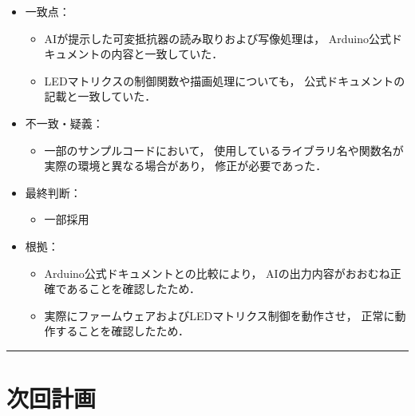 \documentclass[uplatex,dvipdfmx,a4paper,11pt]{jsarticle}
\newcommand{\sectionrule}{\par\medskip\noindent\rule{\linewidth}{0.6pt}\par\medskip}
\begin{document}
\begin{itemize}

    \item 一致点：
      \begin{itemize}
        \item AIが提示した可変抵抗器の読み取りおよび写像処理は，
        Arduino公式ドキュメントの内容と一致していた．

        \item LEDマトリクスの制御関数や描画処理についても，
        公式ドキュメントの記載と一致していた．
      \end{itemize}

      \item 不一致・疑義：
    \begin{itemize}
      \item 一部のサンプルコードにおいて，
      使用しているライブラリ名や関数名が実際の環境と異なる場合があり，
      修正が必要であった．
    \end{itemize}

  \item 最終判断：
    \begin{itemize}
      \item 一部採用
    \end{itemize}

    \item 根拠：
    \begin{itemize}
      \item Arduino公式ドキュメントとの比較により，
      AIの出力内容がおおむね正確であることを確認したため．

      \item 実際にファームウェアおよびLEDマトリクス制御を動作させ，
      正常に動作することを確認したため．
    \end{itemize}

\end{itemize}


\sectionrule


\section{次回計画}
\end{document}
